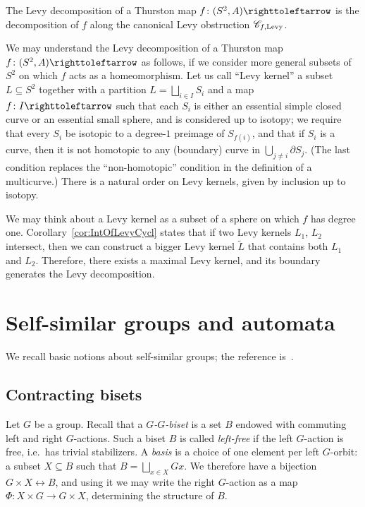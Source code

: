 \documentclass{amsart}
\begin{document}
\begin{defn}\label{def:HypDecomp}
  The Levy decomposition of a Thurston map $f\colon(S^2,A)\selfmap$ is
  the decomposition of $f$ along the canonical Levy obstruction
  ${\mathscr C}_{f,\text{Levy}}$.
\end{defn}

We may understand the Levy decomposition of a Thurston map
$f\colon(S^2,A)\selfmap$ as follows, if we consider more general
subsets of $S^2$ on which $f$ acts as a homeomorphism. Let us call
``Levy kernel'' a subset $L\subseteq S^2$ together with a partition
$L=\bigsqcup_{i\in I} S_i$ and a map $f\colon I\selfmap$ such that
each $S_i$ is either an essential simple closed curve or an essential
small sphere, and is considered up to isotopy; we require that every
$S_i$ be isotopic to a degree-$1$ preimage of $S_{f(i)}$, and that if
$S_i$ is a curve, then it is not homotopic to any (boundary) curve in
$\bigcup_{j\not=i}\partial S_j$. (The last condition replaces the
``non-homotopic'' condition in the definition of a multicurve.)  There
is a natural order on Levy kernels, given by inclusion up to isotopy.

We may think about a Levy kernel as a subset of a sphere on which $f$
has degree one.  Corollary~\ref{cor:IntOfLevyCycl} states that if two
Levy kernels $L_1$, $L_2$ intersect, then we can construct a bigger
Levy kernel $\widetilde L$ that contains both $L_1$ and
$L_2$. Therefore, there exists a maximal Levy kernel, and its boundary
generates the Levy decomposition.

\section{Self-similar groups and automata}\label{ss:bisets}
\noindent We recall basic notions about self-similar groups; the
reference is~\cite{nekrashevych:ssg}.

\subsection{Contracting bisets}
Let $G$ be a group. Recall that a \emph{$G$-$G$-biset} is a set $B$
endowed with commuting left and right $G$-actions. Such a biset $B$ is
called \emph{left-free} if the left $G$-action is free, i.e.\ has
trivial stabilizers. A \emph{basis} is a choice of one element per
left $G$-orbit: a subset $X\subseteq B$ such that
$B=\bigsqcup_{x\in X}G x$. We therefore have a bijection
$G\times X\leftrightarrow B$, and using it we may write the right
$G$-action as a map $\Phi\colon X\times G\to G\times X$, determining
the structure of $B$.
\end{document}
